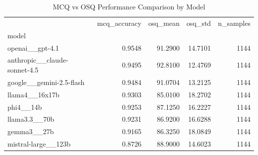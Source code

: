\begin{table}[htbp]
\centering
\caption{MCQ vs OSQ Performance Comparison by Model}
\label{tab:mcq_osq_performance}
\begin{tabular}{lrrrr}
\toprule
 & mcq_accuracy & osq_mean & osq_std & n_samples \\
model &  &  &  &  \\
\midrule
openai__gpt-4.1 & 0.9548 & 91.2900 & 14.7101 & 1144 \\
anthropic__claude-sonnet-4.5 & 0.9495 & 92.8100 & 12.4769 & 1144 \\
google__gemini-2.5-flash & 0.9484 & 91.0704 & 13.2125 & 1144 \\
llama4__16x17b & 0.9303 & 85.0100 & 18.2702 & 1144 \\
phi4__14b & 0.9253 & 87.1250 & 16.2227 & 1144 \\
llama3.3__70b & 0.9231 & 86.9200 & 16.6288 & 1144 \\
gemma3__27b & 0.9165 & 86.3250 & 18.0849 & 1144 \\
mistral-large__123b & 0.8726 & 88.9000 & 14.6023 & 1144 \\
\bottomrule
\end{tabular}

\end{table}
